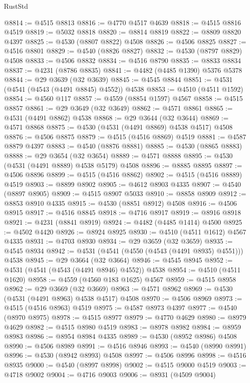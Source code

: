 \begin{lexlean}{RustStd}
\begin{coremodule}
{\begin{coremodule}
{{{{{{{{{{{{{{{{{{{{{{{{{{{{{{{{{{{{{{{{{{{{{{{{{{{{{{{@8814 := @4515 @8813
@8816 := @4770 @4517 @4639
@8818 := @4515 @8816 @4519
@8819 := @5032 @8818
@8820 := @8814 @8819
@8822 := @8809 @8820 @4397
@8825 := @4530 (@8807 @8822) @4508
@8826 := @4506 @8825
@8827 := @4516 @8801
@8829 := @4540 (@8826 @8827)
@8832 := @4530 (@8797 @8829) @4508
@8833 := @4506 @8832
@8834 := @4516 @8790
@8835 := @8833 @8834
@8837 := @4231 (@8786 @8835)
@8841 := @4482 (@4485 @1390) @5376 @5378
@8844 := @29 @3639 (@32 @3639)
@8845 := @4545 @8844
@8851 := @4531 (@4541 (@4543 (@4491 @8845) @4552)) @4538
@8853 := @4510 (@4511 @1592)
@8854 := @4560 @117
@8857 := @4559 (@8854 @1597) @4567
@8858 := @4515 @8857
@8861 := @29 @3649 (@32 @3649)
@8862 := @4571 @8861
@8865 := @4531 (@4491 @8862) @4538
@8868 := @29 @3644 (@32 @3644)
@8869 := @4571 @8868
@8875 := @4530 (@4531 (@4491 @8869) @4538 @4517) @4508
@8876 := @4506 @8875
@8879 := @4515 (@4516 @8869) @4519
@8881 := @4587 @8879 @4397
@8883 := @4540 (@8876 @8881)
@8885 := @4530 (@8865 @8883)
@8888 := @29 @3654 (@32 @3654)
@8889 := @4571 @8888
@8895 := @4530 (@4531 (@4491 @8889) @4538 @5179) @4508
@8896 := @8885 @8895
@8897 := @4506 @8896
@8899 := @4515 (@4516 @8862)
@8902 := @4515 (@4516 @8889) @4519
@8903 := @8899 @8902
@8905 := @4612 @8903 @4335
@8907 := @4540 (@8897 @8905)
@8909 := @4515 @8907 @5033
@8910 := @8858 @8909
@8912 := @8853 @8910 @4335
@8915 := @4530 (@8851 @8912) @4508
@8916 := @4506 @8915
@8917 := @4516 @8845
@8918 := @4716 @8917
@8919 := @8916 @8918
@8921 := @4231 (@8841 @8919)
@8924 := @4482 (@4485 @1414) @4500
@8925 := @4502 @4420
@8926 := @8924 @8925
@8930 := @4510 (@4511 @1612) @4567 @4335
@8931 := @4703 @8930
@8934 := @29 @3659 (@32 @3659)
@8935 := @4545 @8934
@8942 := @4531 (@4541 (@4550 (@4543 (@4491 @8935) @4551))) @4538
@8945 := @29 @3664 (@32 @3664)
@8946 := @4545 @8945
@8952 := @4531 (@4541 (@4543 (@4491 @8946) @4552)) @4538
@8954 := @4510 (@4511 @1620)
@8958 := @4559 (@4560 @183 @1625) @4567
@8959 := @4515 @8958
@8962 := @29 @3669 (@32 @3669)
@8963 := @4571 @8962
@8969 := @4530 (@4531 (@4491 @8963) @4538 @4517) @4508
@8970 := @4506 @8969
@8973 := @4515 (@4516 @8963) @4519
@8975 := @4587 @8973 @4397
@8977 := @4540 (@8970 @8975)
@8978 := @4515 @8977
@8979 := @4770 @4629
@8980 := @8979 @4629
@8982 := @4515 @8980 @4519
@8983 := @8978 @8982
@8984 := @8959 @8983
@8986 := @8954 @8984 @4335
@8989 := @4530 (@8952 @8986) @4508
@8990 := @4506 @8989
@8991 := @4516 @8946
@8993 := @4540 (@8990 @8991)
@8996 := @4530 (@8942 @8993) @4508
@8997 := @4506 @8996
@8998 := @4516 @8935
@9000 := @4540 (@8997 @8998)
@9002 := @4515 @9000 @4519
@9003 := @4718 @9002
@9004 := @4716 @9003
@9006 := @8931 (@4509 @9004)
}}}}}}}}}}}}}}}}}}}}}}}}}}}}}}}}}}}}}}}}}}}}}}}}}}}}}}}
\end{coremodule}}
\end{coremodule}
\end{lexlean}
